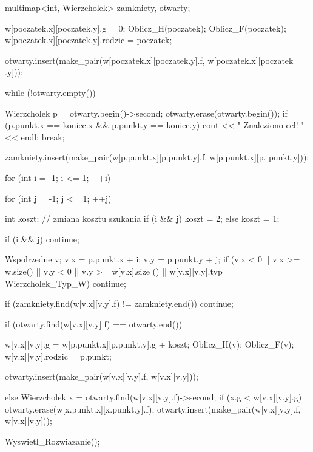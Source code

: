\begin{DoxyCode}
{
    multimap<int, Wierzcholek> zamkniety, otwarty;
        
    w[poczatek.x][poczatek.y].g = 0;
    Oblicz_H(poczatek);
    Oblicz_F(poczatek);
    w[poczatek.x][poczatek.y].rodzic = poczatek;

    otwarty.insert(make_pair(w[poczatek.x][poczatek.y].f, w[poczatek.x][poczatek
      .y]));
        
    while (!otwarty.empty()) 
    {
        Wierzcholek p = otwarty.begin()->second;
        otwarty.erase(otwarty.begin());
        if (p.punkt.x == koniec.x && p.punkt.y == koniec.y) 
        {
            cout << " Znaleziono cel! " << endl;
            break;
        }
        
        zamkniety.insert(make_pair(w[p.punkt.x][p.punkt.y].f, w[p.punkt.x][p.
      punkt.y]));
            
        for (int i = -1; i <= 1; ++i) 
        {
            for (int j = -1; j <= 1; ++j) 
            {
                int koszt;
                                // zmiana kosztu szukania
                if (i && j)
                    koszt = 2;
                else
                    koszt = 1;
                    
                if (i && j)
                    continue;
                    
                Wspolrzedne v;
                v.x = p.punkt.x + i;
                v.y = p.punkt.y + j;
                if (v.x < 0 || v.x >= w.size() || v.y < 0 || v.y >= w[v.x].size
      () || w[v.x][v.y].typ == Wierzcholek_Typ_W) 
                {
                        continue;
                }
                
                if (zamkniety.find(w[v.x][v.y].f) != zamkniety.end()) 
                {
                    continue;
                }
                
                if (otwarty.find(w[v.x][v.y].f) == otwarty.end()) 
                {
                    w[v.x][v.y].g = w[p.punkt.x][p.punkt.y].g + koszt;
                    Oblicz_H(v);
                    Oblicz_F(v);
                    w[v.x][v.y].rodzic = p.punkt;
                                        
                    otwarty.insert(make_pair(w[v.x][v.y].f, w[v.x][v.y]));
                }
                else 
                {
                    Wierzcholek x = otwarty.find(w[v.x][v.y].f)->second;
                    if (x.g < w[v.x][v.y].g) 
                    {
                        otwarty.erase(w[x.punkt.x][x.punkt.y].f);
                        otwarty.insert(make_pair(w[v.x][v.y].f, w[v.x][v.y]));
                    }
                }
            }
        }
    }
    Wyswietl_Rozwiazanie();
}\end{DoxyCode}


